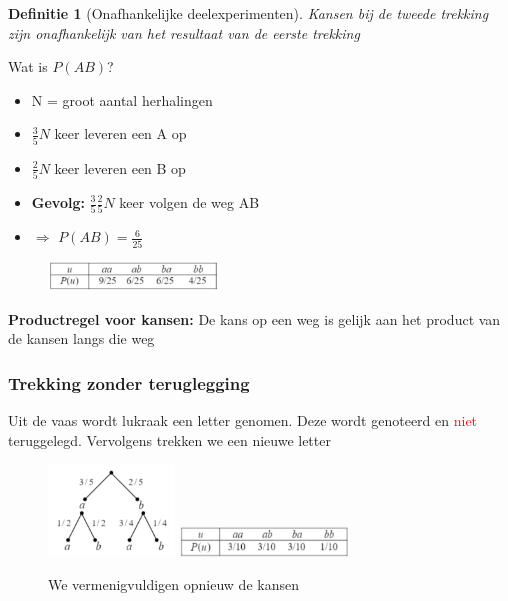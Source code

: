 \documentclass{article}
\newtheorem{theorem}{Definitie}[section]
\begin{document}
\begin{theorem}[Onafhankelijke deelexperimenten]
    Kansen bij de tweede trekking zijn onafhankelijk van het resultaat van de eerste trekking
\end{theorem}

Wat is $P(AB)$?

\begin{itemize}
    \item N = groot aantal herhalingen
    \item $\frac{3}{5}N$ keer leveren een A op
    \item $\frac{2}{5}N$ keer leveren een B op
    \item \textbf{Gevolg:} $\frac35 \frac25 N$ keer volgen de weg AB
    \item $\Rightarrow$ $P(AB) = \frac{6}{25}$
\end{itemize}

\begin{figure}[H]
    \centering
    \includegraphics[width=0.4\textwidth]{trekking-met-teruglegging-tabel.png}
    \caption{}
\end{figure}


\textbf{Productregel voor kansen:} De kans op een weg is gelijk aan het product van de kansen langs die weg
    

\subsubsection{Trekking zonder teruglegging}

Uit de vaas wordt lukraak een letter genomen. Deze wordt genoteerd en \textcolor{red}{niet} teruggelegd.
Vervolgens trekken we een nieuwe letter

\begin{figure}[H]
    \centering
    \includegraphics[width=0.3\textwidth]{trekking-zonder-teruglegging-kansboom.png}
    \includegraphics[width=0.4\textwidth]{trekking-zonder-teruglegging-tabel.png}
    \caption{We vermenigvuldigen opnieuw de kansen}
\end{figure}
\end{document}
